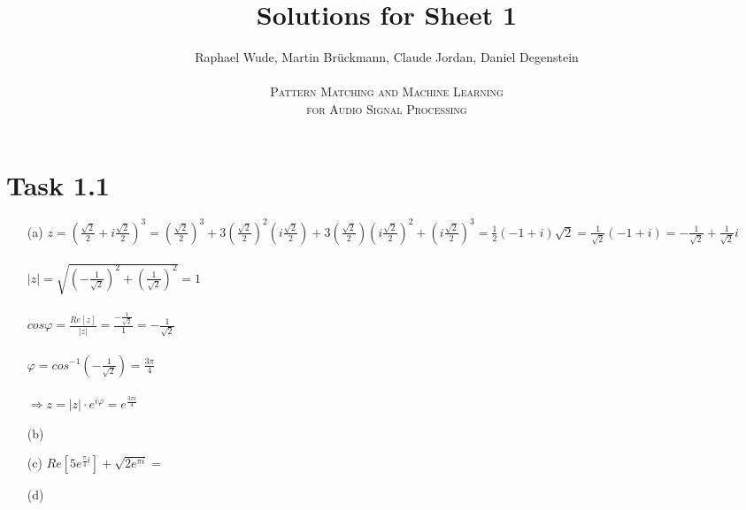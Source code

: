 \documentclass[12pt]{article}
\begin{document}
\title{Solutions for Sheet 1}
\author{Raphael Wude, Martin Brückmann, Claude Jordan, Daniel Degenstein\\ \\
\textsc{Pattern Matching and Machine Learning} \\
\textsc{for Audio Signal Processing}}
\maketitle

\section*{Task 1.1}
\begin{itemize}
    \item[(a)]
    $z = (\frac{\sqrt{2}}{2}+i\frac{\sqrt{2}}{2})^{3} = (\frac{\sqrt{2}}{2})^{3} + 3(\frac{\sqrt{2}}{2})^{2}(i\frac{\sqrt{2}}{2}) + 3(\frac{\sqrt{2}}{2})(i\frac{\sqrt{2}}{2})^{2} + (i\frac{\sqrt{2}}{2})^{3} = \frac{1}{2}(-1+i)\sqrt{2}=\frac{1}{\sqrt{2}}(-1+i)=-\frac{1}{\sqrt{2}}+\frac{1}{\sqrt{2}}i$\\\\
    $|z|=\sqrt{(-\frac{1}{\sqrt{2}})^{2}+(\frac{1}{\sqrt{2}})^{2}}=1$\\\\
    $cos\varphi=\frac{Re[z]}{|z|}=\frac{-\frac{1}{\sqrt{2}}}{1}=-\frac{1}{\sqrt{2}}$\\\\
    $\varphi=cos^{-1}(-\frac{1}{\sqrt{2}})=\frac{3\pi}{4}$\\\\
    $\Rightarrow z=|z|\cdot e^{i\varphi}=e^{\frac{3\pi i}{4}}$
    
    \item[(b)]
    
    \item[(c)]
    $Re[5e^{\frac{\pi}{4}i}]+\sqrt{2e^{\pi i}} = $
    \item[(d)]
    
\end{itemize}
 
\end{document}
